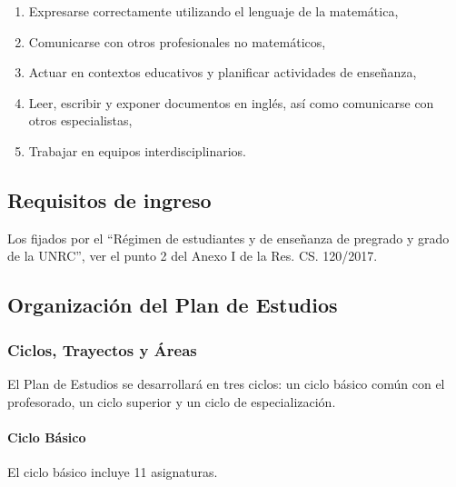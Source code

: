 \documentclass[a4paper, 12pt]{article}
\begin{document}
\begin{enumerate}
\item {Expresarse correctamente
utilizando el lenguaje de la
matemática,} 
 


\item {Comunicarse
con otros profesionales no matemáticos,} 

 

\item {Actuar en contextos educativos y planificar actividades de enseñanza,} 
 


\item {Leer, escribir y exponer documentos en
inglés, así como comunicarse con otros
especialistas,} 

 


\item {Trabajar en equipos
interdisciplinarios.} 

\end{enumerate}


\subsection{Requisitos de ingreso}



Los fijados por el ``Régimen  de estudiantes y de enseñanza de pregrado y grado de la UNRC'', ver  el punto 2 del Anexo I de la Res. CS. 120/2017. 



\subsection{Organización del Plan de Estudios}

\subsubsection{Ciclos, Trayectos  y Áreas} El Plan de Estudios se desarrollará en tres ciclos:
un ciclo básico común con el profesorado, un ciclo superior y un
ciclo de especialización.

\paragraph{Ciclo Básico} El ciclo básico incluye 11 asignaturas.
\end{document}

